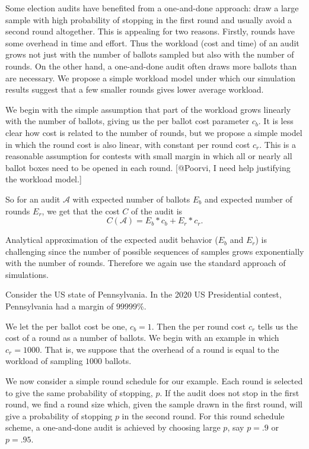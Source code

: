 Some election audits have benefited from a one-and-done approach: draw a large sample with high probability of stopping in the first round and usually avoid a second round altogether. This is appealing for two reasons. Firstly, rounds have some overhead in time and effort. Thus the workload (cost and time) of an audit grows not just with the number of ballots sampled but also with the number of rounds. On the other hand, a one-and-done audit often draws more ballots than are necessary. We propose a simple workload model under which our simulation results suggest that a few smaller rounds gives lower average workload. 

We begin with the simple assumption that part of the workload grows linearly with the number of ballots, giving us the per ballot cost parameter $c_{b}$. It is less clear how cost is related to the number of rounds, but we propose a simple model in which the round cost is also linear, with constant per round cost $c_{r}$. This is a reasonable assumption for contests with small margin in which all or nearly all ballot boxes need to be opened in each round. [@Poorvi, I need help justifying the workload model.]

So for an audit $\mathcal{A}$ with expected number of ballots $E_{b}$ and expected number of rounds $E_{r}$, we get that the cost $C$ of the audit is
$$C(\mathcal{A}) = E_b * c_b + E_r * c_r.$$

Analytical approximation of the expected audit behavior ($E_b$ and $E_r$) is challenging since the number of possible sequences of samples grows exponentially with the number of rounds. 
Therefore we again use the standard approach of simulations.

Consider the US state of Pennsylvania. In the 2020 US Presidential contest, Pennsylvania had a margin of $99999\%$.

We let the per ballot cost be one, $c_b=1$. Then the per round cost $c_r$ tells us the cost of a round as a number of ballots. We begin with an example in which $c_r=1000$. That is, we suppose that the overhead of a round is equal to the workload of sampling $1000$ ballots.

We now consider a simple round schedule for our example. Each round is selected to give the same probability of stopping, $p$. If the audit does not stop in the first round, we find a round size which, given the sample drawn in the first round, will give a probability of stopping $p$ in the second round. For this round schedule scheme, a one-and-done audit is achieved by choosing large $p$, say $p=.9$ or $p=.95$.

